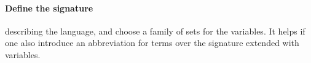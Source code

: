 \paragraph*{Define the signature}
\label{sec:define-signature} describing the language, and choose
  a family of sets for the variables. It helps if one also introduce
  an abbreviation for terms over the signature extended with
  variables.

  \begin{code}
    \>[0]\AgdaSpace{}%
\AgdaSpace{}%
\AgdaSymbol{:}\AgdaSpace{}%
\AgdaSpace{}%
\AgdaSpace{}%
\AgdaSpace{}%
\AgdaSpace{}%
\AgdaSpace{}%
\AgdaSpace{}%
\<%
\\
\>[0][@{}l@{\AgdaIndent{0}}]%
\>[2]%
\>[7]\AgdaSymbol{:}\AgdaSpace{}%
\AgdaSpace{}%
\AgdaSymbol{(}\AgdaInductiveConstructor{[]}\AgdaSpace{}%
\AgdaSpace{}%
\AgdaSymbol{)}\<%
\\
%
\>[2]%
\>[7]\AgdaSymbol{:}\AgdaSpace{}%
\AgdaSpace{}%
\AgdaSymbol{(}\AgdaInductiveConstructor{[]}\AgdaSpace{}%
\AgdaSpace{}%
\AgdaSymbol{)}\<%
\\
%
\>[2]\AgdaSpace{}%
\AgdaSymbol{:}\AgdaSpace{}%
\AgdaSpace{}%
\AgdaSymbol{(}\AgdaOperator{\AgdaFunction{[}}\AgdaSpace{}%
\AgdaSpace{}%
\AgdaOperator{\AgdaFunction{]}}\AgdaSpace{}%
\AgdaSpace{}%
\AgdaSymbol{)}\<%
\\
%
\>[2]\AgdaSpace{}%
\AgdaSymbol{:}\AgdaSpace{}%
\AgdaSpace{}%
\AgdaSymbol{((}\AgdaSpace{}%
\AgdaSpace{}%
\AgdaOperator{\AgdaFunction{[}}\AgdaSpace{}%
\AgdaSpace{}%
\AgdaOperator{\AgdaFunction{]}}\AgdaSymbol{)}\AgdaSpace{}%
\AgdaSpace{}%
\AgdaSymbol{)}\<%
\\
%
\>[2]%
\>[7]\AgdaSymbol{:}\AgdaSpace{}%
\AgdaSpace{}%
\AgdaSymbol{((}\AgdaSpace{}%
\AgdaSpace{}%

\end{code}
